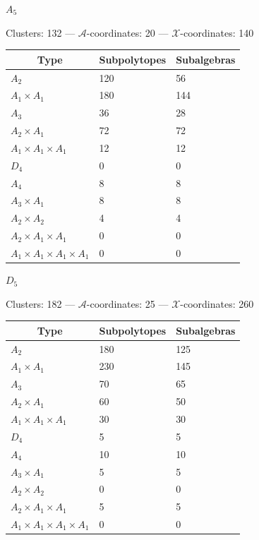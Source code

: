\documentclass[11pt]{article}
\def\xcoords{$\mathcal{X}$-coordinates}
\def\acoords{$\mathcal{A}$-coordinates}
\begin{document}
\begin{center}
\newpage 

{ \qquad \qquad \Large{\(A_5\)} \hfill}

\vspace{.2cm}
\qquad Clusters: 132 \quad --- \quad \acoords: 20 \quad --- \quad \xcoords: 140 \hfill \\[1em]

\begin{tabular}{ | l | l | l |}
\multicolumn{1}{c}{Type} &  \multicolumn{1}{c}{Subpolytopes}  &  \multicolumn{1}{c}{Subalgebras} \\
\hline \(A_2\) & 120 & 56 \\ 
\hline \(A_1 \times A_1\) & 180 & 144 \\ \hline 
\hline \(A_3\) & 36 & 28 \\ 
\hline \(A_2 \times A_1\) & 72 & 72 \\ 
\hline \(A_1 \times A_1 \times A_1\) & 12 & 12 \\ \hline 
\hline \(D_4\) & 0 & 0 \\ 
\hline \(A_4\) & 8 & 8 \\ 
\hline \(A_3 \times A_1\) & 8 & 8 \\ 
\hline \(A_2 \times A_2\) & 4 & 4 \\ 
\hline \(A_2 \times A_1 \times A_1\) & 0 & 0 \\ 
\hline \(A_1 \times A_1 \times A_1 \times A_1\) & 0 & 0 \\ 
\hline
\end{tabular} 
\vspace{.5cm}

{ \qquad \qquad \Large{\(D_5\)} \hfill}

\vspace{.2cm}
\qquad Clusters: 182 \quad --- \quad \acoords: 25 \quad --- \quad \xcoords: 260 \hfill \\[1em]

\begin{tabular}{ | l | l | l |} 
\multicolumn{1}{c}{Type} &  \multicolumn{1}{c}{Subpolytopes}  &  \multicolumn{1}{c}{Subalgebras} \\
\hline \(A_2\) & 180 & 125 \\ 
\hline \(A_1 \times A_1\) & 230 & 145 \\ \hline 
\hline \(A_3\) & 70 & 65 \\ 
\hline \(A_2 \times A_1\) & 60 & 50 \\ 
\hline \(A_1 \times A_1 \times A_1\) & 30 & 30 \\ \hline 
\hline \(D_4\) & 5 & 5 \\ 
\hline \(A_4\) & 10 & 10 \\ 
\hline \(A_3 \times A_1\) & 5 & 5 \\ 
\hline \(A_2 \times A_2\) & 0 & 0 \\ 
\hline \(A_2 \times A_1 \times A_1\) & 5 & 5 \\ 
\hline \(A_1 \times A_1 \times A_1 \times A_1\) & 0 & 0 \\ 
\hline
\end{tabular}
\vspace{.5cm}


\end{center}
\end{document}
